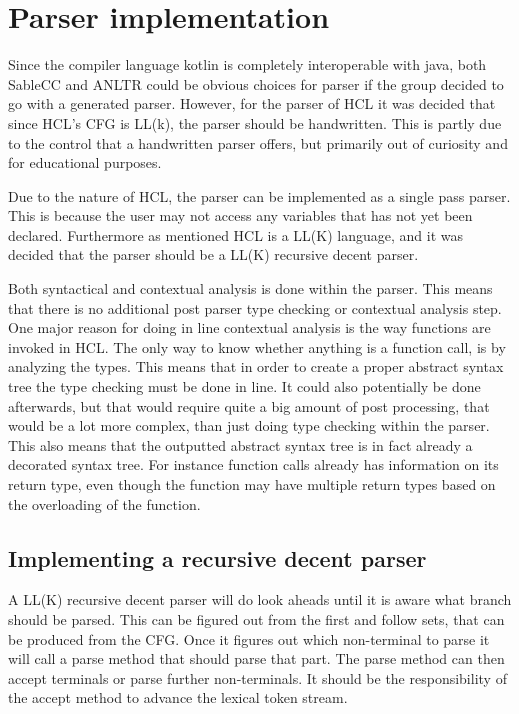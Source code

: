 \section{Parser implementation}

Since the compiler language kotlin is completely interoperable with java, both SableCC and ANLTR could be obvious choices for parser if the group decided to go with a generated parser. 
However, for the parser of HCL it was decided that since HCL's CFG is LL(k), the parser should be handwritten. 
This is partly due to the control that a handwritten parser offers, but primarily out of curiosity and for educational purposes.

Due to the nature of HCL, the parser can be implemented as a single pass parser. 
This is because the user may not access any variables that has not yet been declared. 
Furthermore as mentioned HCL is a LL(K) language, and it was decided that the parser should be a LL(K) recursive decent parser.

Both syntactical and contextual analysis is done within the parser. 
This means that there is no additional post parser type checking or contextual analysis step. 
One major reason for doing in line contextual analysis is the way functions are invoked in HCL. 
The only way to know whether anything is a function call, is by analyzing the types. 
This means that in order to create a proper abstract syntax tree the type checking must be done in line. 
It could also potentially be done afterwards, but that would require quite a big amount of post processing, that would be a lot more complex, than just doing type checking within the parser. 
This also means that the outputted abstract syntax tree is in fact already a decorated syntax tree. 
For instance function calls already has information on its return type, even though the function may have multiple return types based on the overloading of the function.

\subsection{Implementing a recursive decent parser}

A LL(K) recursive decent parser will do look aheads until it is aware what branch should be parsed.
This can be figured out from the first and follow sets, that can be produced from the CFG.
Once it figures out which non-terminal to parse it will call a parse method that should parse that part.
The parse method can then accept terminals or parse further non-terminals.
It should be the responsibility of the accept method to advance the lexical token stream.


